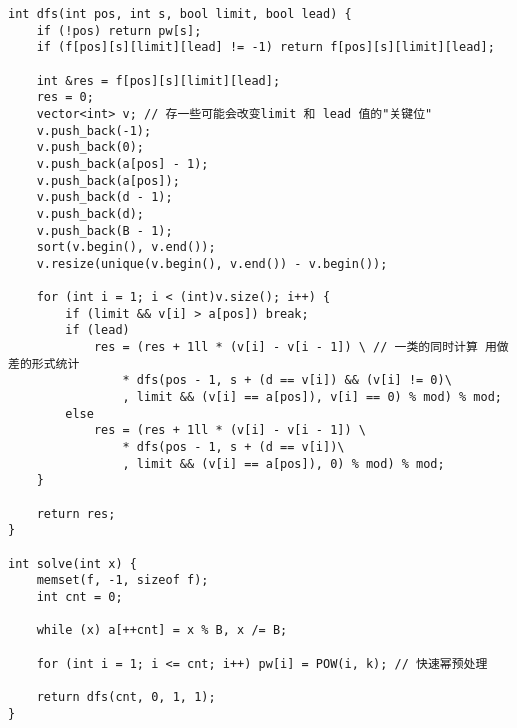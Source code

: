\begin{verbatim}
int dfs(int pos, int s, bool limit, bool lead) {
    if (!pos) return pw[s];
    if (f[pos][s][limit][lead] != -1) return f[pos][s][limit][lead];

    int &res = f[pos][s][limit][lead];
    res = 0;
    vector<int> v; // 存一些可能会改变limit 和 lead 值的"关键位"
    v.push_back(-1);
    v.push_back(0);
    v.push_back(a[pos] - 1);
    v.push_back(a[pos]);
    v.push_back(d - 1);
    v.push_back(d);
    v.push_back(B - 1);
    sort(v.begin(), v.end());
    v.resize(unique(v.begin(), v.end()) - v.begin());

    for (int i = 1; i < (int)v.size(); i++) {
        if (limit && v[i] > a[pos]) break;
        if (lead)
            res = (res + 1ll * (v[i] - v[i - 1]) \ // 一类的同时计算 用做差的形式统计
                * dfs(pos - 1, s + (d == v[i]) && (v[i] != 0)\
                , limit && (v[i] == a[pos]), v[i] == 0) % mod) % mod;
        else
            res = (res + 1ll * (v[i] - v[i - 1]) \
                * dfs(pos - 1, s + (d == v[i])\
                , limit && (v[i] == a[pos]), 0) % mod) % mod;
    }

    return res;
}

int solve(int x) {
    memset(f, -1, sizeof f);
    int cnt = 0;

    while (x) a[++cnt] = x % B, x /= B;

    for (int i = 1; i <= cnt; i++) pw[i] = POW(i, k); // 快速幂预处理

    return dfs(cnt, 0, 1, 1);
}
\end{verbatim}

